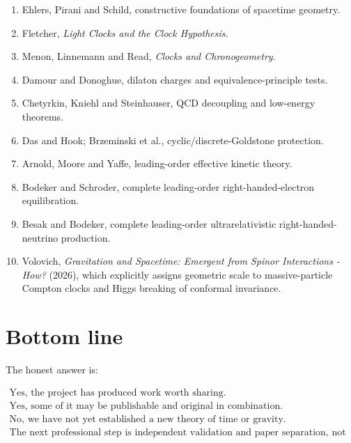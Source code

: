 \documentclass[
  10pt,
]{article}
\providecommand{\tightlist}{%
  \setlength{\itemsep}{0pt}\setlength{\parskip}{0pt}}
\begin{document}
\begin{enumerate}
\def\labelenumi{\arabic{enumi}.}
\tightlist
\item
  Ehlers, Pirani and Schild, constructive foundations of spacetime
  geometry.
\item
  Fletcher, \emph{Light Clocks and the Clock Hypothesis}.
\item
  Menon, Linnemann and Read, \emph{Clocks and Chronogeometry}.
\item
  Damour and Donoghue, dilaton charges and equivalence-principle tests.
\item
  Chetyrkin, Kniehl and Steinhauser, QCD decoupling and low-energy
  theorems.
\item
  Das and Hook; Brzeminski et al., cyclic/discrete-Goldstone protection.
\item
  Arnold, Moore and Yaffe, leading-order effective kinetic theory.
\item
  Bodeker and Schroder, complete leading-order right-handed-electron
  equilibration.
\item
  Besak and Bodeker, complete leading-order ultrarelativistic
  right-handed-neutrino production.
\item
  Volovich, \emph{Gravitation and Spacetime: Emergent from Spinor
  Interactions - How?} (2026), which explicitly assigns geometric scale
  to massive-particle Compton clocks and Higgs breaking of conformal
  invariance.
\end{enumerate}

\section{Bottom line}\label{bottom-line}

The honest answer is:

\[
\boxed{
\begin{gathered}
\text{Yes, the project has produced work worth sharing.}\\
\text{Yes, some of it may be publishable and original in combination.}\\
\text{No, we have not yet established a new theory of time or gravity.}\\
\text{The next professional step is independent validation and paper separation, not more conceptual sprawl.}
\end{gathered}
}
\]
\end{document}
